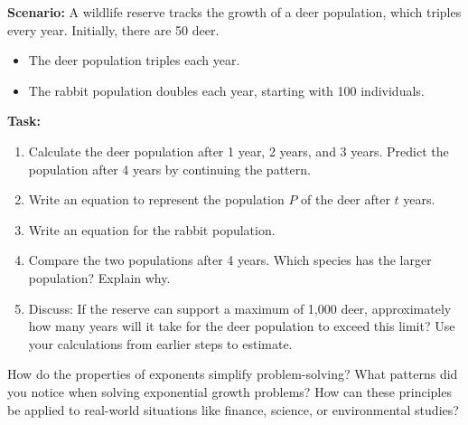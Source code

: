 \documentclass[12pt]{article}
\begin{document}
\begin{tcolorbox}[colframe=black!60, colback=white, 
coltitle=black, colbacktitle=black!15, fonttitle=\bfseries\Large, 
title=Performance Task: Predicting Population Growth, halign title=center, left=10pt, right=10pt, top=10pt, bottom=50pt]
\textbf{Scenario:} A wildlife reserve tracks the growth of a deer population, which triples every year. Initially, there are 50 deer.
\begin{itemize}
    \item The deer population triples each year.
    \item The rabbit population doubles each year, starting with 100 individuals.
\end{itemize}
\textbf{Task:}
\begin{enumerate}[itemsep=3em]
    
    \item Calculate the deer population after 1 year, 2 years, and 3 years. Predict the population after 4 years by continuing the pattern.
    \item Write an equation to represent the population \(P\) of the deer after \(t\) years.
    \item Write an equation for the rabbit population.
    \item Compare the two populations after 4 years. Which species has the larger population? Explain why.
    \item Discuss: If the reserve can support a maximum of 1,000 deer, approximately how many years will it take for the deer population to exceed this limit? Use your calculations from earlier steps to estimate.
\end{enumerate}
\end{tcolorbox}



\begin{tcolorbox}[colframe=black!60, colback=white, 
coltitle=black, colbacktitle=black!15, fonttitle=\bfseries\Large, 
title=Reflection, halign title=center, left=10pt, right=10pt, top=10pt, bottom=80pt]
How do the properties of exponents simplify problem-solving? What patterns did you notice when solving exponential growth problems? How can these principles be applied to real-world situations like finance, science, or environmental studies?
\end{tcolorbox}
\end{document}
